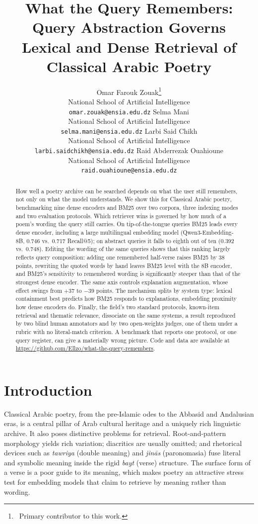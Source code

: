 \documentclass[11pt]{article}
\title{What the Query Remembers: Query Abstraction Governs\\Lexical and Dense Retrieval of Classical Arabic Poetry}
\author{
  Omar Farouk Zouak\thanks{\ Primary contributor to this work.} \\
  National School of Artificial Intelligence \\
  \texttt{omar.zouak@ensia.edu.dz}
  \And
  Selma Mani \\
  National School of Artificial Intelligence \\
  \texttt{selma.mani@ensia.edu.dz}
  \AND
  Larbi Said Chikh \\
  National School of Artificial Intelligence \\
  \texttt{larbi.saidchikh@ensia.edu.dz}
  \And
  Raid Abderrezak Ouahioune \\
  National School of Artificial Intelligence \\
  \texttt{raid.ouahioune@ensia.edu.dz}
}
\begin{document}
\maketitle

\begin{abstract}
How well a poetry archive can be searched depends on what the user still remembers, not only on what the model understands. We show this for Classical Arabic poetry, benchmarking nine dense encoders and BM25 over two corpora, three indexing modes and two evaluation protocols. Which retriever wins is governed by how much of a poem's wording the query still carries. On tip-of-the-tongue queries BM25 leads every dense encoder, including a large multilingual embedding model (Qwen3-Embedding-8B, 0.746 vs.\ 0.717 Recall@5); on abstract queries it falls to eighth out of ten (0.392 vs.\ 0.748). Editing the wording of the same queries shows that this ranking largely reflects query composition: adding one remembered half-verse raises BM25 by 38 points, rewriting the quoted words by hand leaves BM25 level with the 8B encoder, and BM25's sensitivity to remembered wording is significantly steeper than that of the strongest dense encoder. The same axis controls explanation augmentation, whose effect swings from $+37$ to $-39$ points. The mechanism splits by system type: lexical containment best predicts how BM25 responds to explanations, embedding proximity how dense encoders do. Finally, the field's two standard protocols, known-item retrieval and thematic relevance, dissociate on the same systems, a result reproduced by two blind human annotators and by two open-weights judges, one of them under a rubric with no literal-match criterion. A benchmark that reports one protocol, or one query register, can give a materially wrong picture. Code and data are available at \url{https://github.com/Ellzo/what-the-query-remembers}.
\end{abstract}

\section{Introduction}
\label{sec:intro}

Classical Arabic poetry, from the pre-Islamic odes to the Abbasid and Andalusian eras, is a central pillar of Arab cultural heritage and a uniquely rich linguistic archive. It also poses distinctive problems for retrieval. Root-and-pattern morphology yields rich variation; diacritics are usually omitted; and rhetorical devices such as \textit{tawriya} (double meaning) and \textit{jin\=as} (paronomasia) fuse literal and symbolic meaning inside the rigid \textit{bayt} (verse) structure. The surface form of a verse is a poor guide to its meaning, which makes poetry an attractive stress test for embedding models that claim to retrieve by meaning rather than wording.
\end{document}
